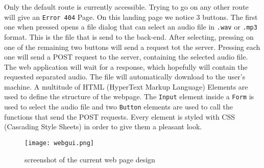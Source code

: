 \documentclass[../Thesis.tex]{subfiles}
\begin{document}
Only the default route is currently accessible. Trying to go on any other route will give an \texttt{Error 404} Page. On this landing page we notice 3 buttons. The first one when pressed opens a file dialog that can select an audio file in \texttt{.wav} or \texttt{.mp3} format. This is the file that is send to the back-end. After selecting, pressing on one of the remaining two buttons will send a request tot the server. Pressing each one will send a POST request to the server, containing the selected audio file. The web application will wait for a response, which hopefully will contain the requested separated audio. The file will automatically download to the user’s machine. 
A multitude of HTML (HyperText Markup Language) Elements are used to define the structure of the webpage. The \texttt{Input} element inside a \texttt{Form} is used to select the audio file and two \texttt{Button} elements are used to call the functions that send the POST requests. Every element is styled with CSS (Cascading Style Sheets) in order to give them a pleasant look. 

\begin{figure}[h]
\centering
\label {fig: web}
\texttt{[image: webgui.png]}
\caption[width=0.5\textwidth]{screenshot of the current web page design}
\end{figure}
\end{document}
